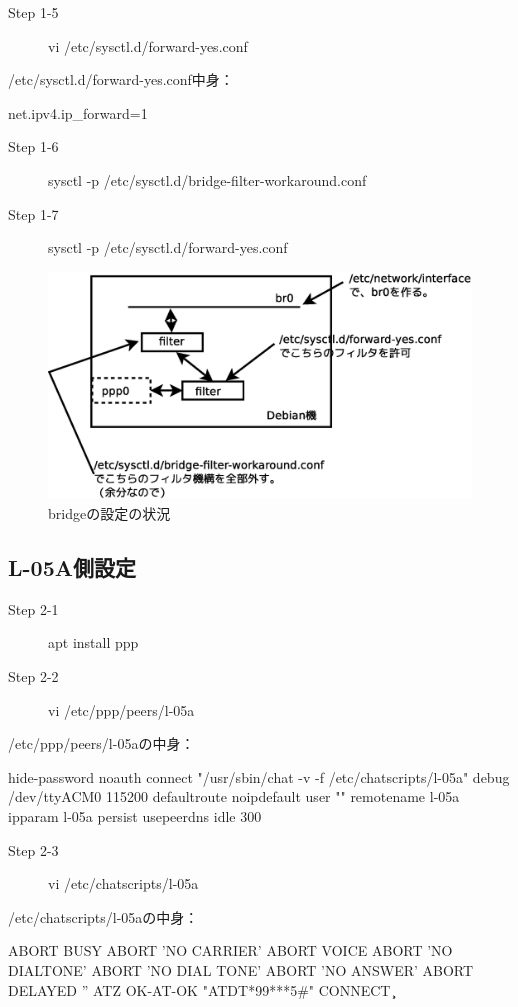 \documentclass[mingoth,a4paper]{jsarticle}
\begin{document}
  \begin{description}
    \item [Step 1-5] vi /etc/sysctl.d/forward-yes.conf
  \end{description}      
 /etc/sysctl.d/forward-yes.conf中身：
\begin{commandline}
net.ipv4.ip_forward=1
\end{commandline}

  \begin{description}
  \item [Step 1-6] sysctl -p /etc/sysctl.d/bridge-filter-workaround.conf
  \item [Step 1-7] sysctl -p /etc/sysctl.d/forward-yes.conf
　\end{description}

\begin{figure}[htbp]
\includegraphics[width=0.5\hsize]{image201512/bridge.eps}
\caption{bridgeの設定の状況}
\end{figure}
  
\subsection{L-05A側設定}

  \begin{description}
    \item [Step 2-1] apt install ppp
    \item [Step 2-2] vi /etc/ppp/peers/l-05a
  \end{description}      


 /etc/ppp/peers/l-05aの中身：
\begin{commandline}
hide-password 
noauth 
connect "/usr/sbin/chat -v -f /etc/chatscripts/l-05a"
debug 
/dev/ttyACM0
115200
defaultroute
noipdefault 
user ""
remotename l-05a
ipparam l-05a
persist 
usepeerdns 
idle 300
\end{commandline}
  
  \begin{description}
    \item [Step 2-3] vi /etc/chatscripts/l-05a
  \end{description}      
 /etc/chatscripts/l-05aの中身：
\begin{commandline}
ABORT BUSY ABORT 'NO CARRIER' ABORT VOICE 
ABORT 'NO DIALTONE' ABORT 'NO DIAL TONE' 
ABORT 'NO ANSWER' ABORT DELAYED
'' ATZ
OK-AT-OK "ATDT*99***5#"
CONNECT \d\c
\end{commandline}
\end{document}
